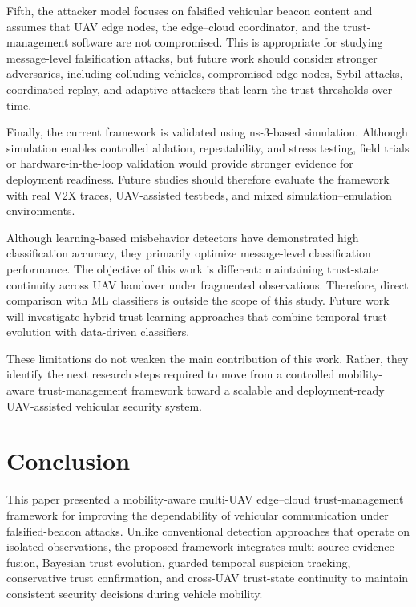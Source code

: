 \documentclass[journal]{IEEEtran}
\begin{document}
Fifth, the attacker model focuses on falsified vehicular beacon content and assumes that UAV edge nodes, the edge--cloud coordinator, and the trust-management software are not compromised. This is appropriate for studying message-level falsification attacks, but future work should consider stronger adversaries, including colluding vehicles, compromised edge nodes, Sybil attacks, coordinated replay, and adaptive attackers that learn the trust thresholds over time.

Finally, the current framework is validated using ns-3-based simulation. Although simulation enables controlled ablation, repeatability, and stress testing, field trials or hardware-in-the-loop validation would provide stronger evidence for deployment readiness. Future studies should therefore evaluate the framework with real V2X traces, UAV-assisted testbeds, and mixed simulation--emulation environments.

Although learning-based misbehavior detectors have demonstrated
high classification accuracy, they primarily optimize message-level
classification performance. The objective of this work is different:
maintaining trust-state continuity across UAV handover under
fragmented observations. Therefore, direct comparison with ML
classifiers is outside the scope of this study. Future work will
investigate hybrid trust-learning approaches that combine temporal
trust evolution with data-driven classifiers.

These limitations do not weaken the main contribution of this work. Rather, they identify the next research steps required to move from a controlled mobility-aware trust-management framework toward a scalable and deployment-ready UAV-assisted vehicular security system.

\section{Conclusion}
\label{sec:conclusion}

This paper presented a mobility-aware multi-UAV edge--cloud trust-management
framework for improving the dependability of vehicular communication under
falsified-beacon attacks. Unlike conventional detection approaches that
operate on isolated observations, the proposed framework integrates
multi-source evidence fusion, Bayesian trust evolution, guarded temporal
suspicion tracking, conservative trust confirmation, and cross-UAV
trust-state continuity to maintain consistent security decisions during
vehicle mobility.
\end{document}
